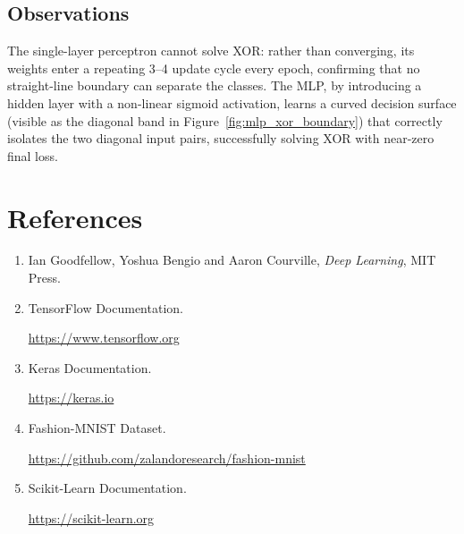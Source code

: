 \documentclass[12pt,a4paper]{article}
\begin{document}
\subsection{Observations}

The single-layer perceptron cannot solve XOR: rather than converging, its weights
enter a repeating 3--4 update cycle every epoch, confirming that no straight-line
boundary can separate the classes. The MLP, by introducing a hidden layer with a
non-linear sigmoid activation, learns a curved decision surface (visible as the
diagonal band in Figure~\ref{fig:mlp_xor_boundary}) that correctly isolates the two
diagonal input pairs, successfully solving XOR with near-zero final loss.
\section{References}

\begin{enumerate}

\item Ian Goodfellow, Yoshua Bengio and Aaron Courville, \textit{Deep Learning}, MIT Press.

\item TensorFlow Documentation.

\url{https://www.tensorflow.org}

\item Keras Documentation.

\url{https://keras.io}

\item Fashion-MNIST Dataset.

\url{https://github.com/zalandoresearch/fashion-mnist}

\item Scikit-Learn Documentation.

\url{https://scikit-learn.org}

\end{enumerate}
\end{document}
